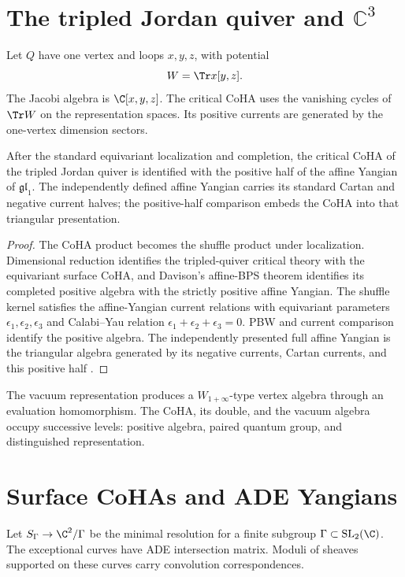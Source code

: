 \chapter{The tripled Jordan quiver and \texorpdfstring{$\mathbb C^3$}{C3}}
Let $Q$ have one vertex and loops $x,y,z$, with potential
\[
 W=\Tr x[y,z].
\]
The Jacobi algebra is $\C[x,y,z]$. The critical CoHA uses the vanishing cycles of $\Tr W$ on the representation spaces. Its positive currents are generated by the one-vertex dimension sectors.

\begin{theorem}
After the standard equivariant localization and completion, the critical CoHA of the tripled Jordan quiver is identified with the positive half of the affine Yangian of $\mathfrak{gl}_1$. The independently defined affine Yangian carries its standard Cartan and negative current halves; the positive-half comparison embeds the CoHA into that triangular presentation.
\end{theorem}
\begin{proof}
The CoHA product becomes the shuffle product under localization. Dimensional reduction identifies the tripled-quiver critical theory with the equivariant surface CoHA, and Davison's affine-BPS theorem identifies its completed positive algebra with the strictly positive affine Yangian. The shuffle kernel satisfies the affine-Yangian current relations with equivariant parameters $\epsilon_1,\epsilon_2,\epsilon_3$ and Calabi--Yau relation $\epsilon_1+\epsilon_2+\epsilon_3=0$. PBW and current comparison identify the positive algebra. The independently presented full affine Yangian is the triangular algebra generated by its negative currents, Cartan currents, and this positive half \cite{DavisonAffineBPS,DavisonMeinhardt,SVYangians,Tsymbaliuk}.
\end{proof}

The vacuum representation produces a $W_{1+\infty}$-type vertex algebra through an evaluation homomorphism. The CoHA, its double, and the vacuum algebra occupy successive levels: positive algebra, paired quantum group, and distinguished representation.

\chapter{Surface CoHAs and ADE Yangians}
Let $S_\Gamma\to\C^2/\Gamma$ be the minimal resolution for a finite subgroup $\Gamma\subset\operatorname{SL}_2(\C)$. The exceptional curves have ADE intersection matrix. Moduli of sheaves supported on these curves carry convolution correspondences.

